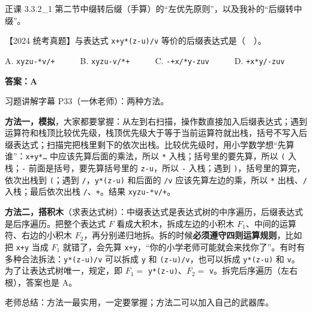 \documentclass[10.5pt,a4paper,oneside]{article}
\newcommand{\hlred}[1]{\textcolor{wdred}{\bfseries #1}}
\newcommand{\uln}[1]{\CJKunderline[format=\color{wdred},thickness=0.9pt,depth=0.28em]{#1}}
\begin{document}
\begin{recallbox}

正课 3.3.2\_1
第二节中缀转后缀（手算）的“左优先原则”，以及我补的“后缀转中缀”。

\end{recallbox}

\begin{questionbox}[19]

【2024 统考真题】与表达式 \texttt{x+y*(z-u)/v}
等价的后缀表达式是（　）。

A. \texttt{xyzu-*v/+}　　　B. \texttt{xyzu-v/*+}　　　C.
\texttt{-+x/*y-zuv}　　　D. \texttt{+x*y/-zuv}

\end{questionbox}

\hlred{\textbf{答案：A}}

\begin{videobox}

习题讲解字幕 P33（一休老师）：两种方法。

\textbf{方法一，模拟}，大家都要掌握：从左到右扫描，操作数直接加入后缀表达式；遇到运算符和栈顶比较优先级，栈顶优先级大于等于当前运算符就出栈，括号不写入后缀表达式；扫描完把栈里剩下的依次出栈。比较优先级时\uln{不用背}，用小学数学想“先算谁”：\texttt{x+y*…}
中应该先算后面的乘法，所以 \texttt{*} 入栈；括号里的要先算，所以
\texttt{(} 入栈；\texttt{-} 前面是括号，要先算括号里的
\texttt{z-u}，所以 \texttt{-} 入栈；遇到
\texttt{)}，括号里的算完，依次出栈到 \texttt{(}；遇到
\texttt{/}，\texttt{y*(z-u)} 和后面的 \texttt{/v} 应该先算左边的乘，所以
\texttt{*} 出栈、\texttt{/} 入栈；最后依次出栈
\texttt{/}、\texttt{+}。结果 \texttt{xyzu-*v/+}。

\textbf{方法二，搭积木}（求表达式树）：中缀表达式是表达式树的中序遍历，后缀表达式是后序遍历。把整个表达式
\(F\) 看成大积木，拆成左边的小积木 \(F_1\)、中间的运算符、右边的小积木
\(F_2\)，再分别递归地拆。拆的时候\hlred{必须遵守四则运算规则}，比如把
\texttt{x+y} 当成 \(F_1\) 就错了，会先算
\texttt{x+y}，“你的小学老师可能就会来找你了”。有时有多种合法拆法：\texttt{y*(z-u)/v}
可以拆成 \texttt{y} 和 \texttt{(z-u)/v}，也可以拆成 \texttt{y*(z-u)} 和
\texttt{v}。为了让表达式树唯一，规定\uln{在合法的前提下选最长的 \(F_1\)}，即
\(F_1=\) \texttt{y*(z-u)}、\(F_2=\)
\texttt{v}。拆完后序遍历（左右根），答案也是 A。

老师总结：方法一最实用，一定要掌握；方法二可以加入自己的武器库。

\end{videobox}

\end{document}
